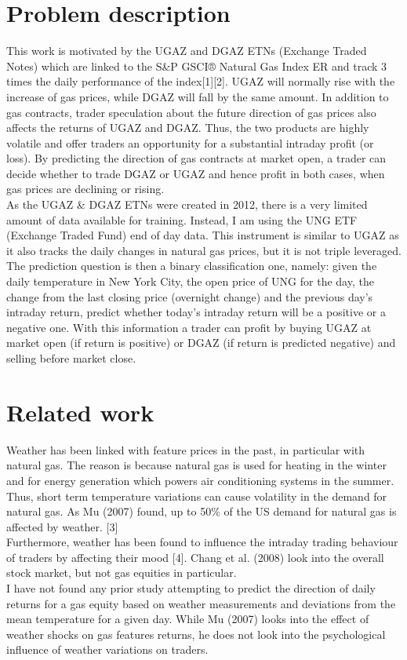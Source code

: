 \documentclass[conference,letterpaper]{IEEEtran}
\begin{document}
\section{Problem description}
This work is motivated by the UGAZ and DGAZ ETNs (Exchange Traded Notes) which are linked to
the S\&P GSCI® Natural Gas Index ER and track 3 times the daily performance of the index[1][2].
UGAZ will normally rise with the increase of gas prices, while DGAZ will fall by the same amount. In addition
to gas contracts, trader speculation about the future direction of gas prices also affects the returns of UGAZ and
DGAZ. Thus, the two products are highly volatile and offer traders an opportunity for a substantial intraday profit (or loss).
By predicting the direction of gas contracts at market open, a trader can decide
whether to trade DGAZ or UGAZ and hence profit in both cases, when gas prices are declining or rising. \\
\indent
As the UGAZ \& DGAZ ETNs were created in 2012, there is a very limited amount of data available 
for training. Instead, I am using the UNG ETF (Exchange Traded Fund) end of day data. This 
instrument is similar to UGAZ as it also tracks the daily changes in natural gas prices, 
but it is not triple leveraged. \\
\indent
The prediction question is then a binary classification one, namely: given the daily temperature 
in New York City, the open price of UNG for the day, the change from the last closing price (overnight change) and the previous day's intraday 
return, predict whether today's intraday return will be a positive or a negative one. With this information a 
trader can profit by buying UGAZ at market open (if return is positive) or DGAZ (if return is predicted negative)
and selling before market close. \\

\section{Related work}
Weather has been linked with feature prices in the past, in particular with natural gas. The reason is because
natural gas is used for heating in the winter and for energy generation which powers air conditioning systems in the summer. 
Thus, short term temperature variations can cause volatility in the demand for natural gas. As Mu (2007) found, up to
50\% of the US demand for natural gas is affected by weather. [3] \\
\indent Furthermore, weather has been found to influence the intraday trading behaviour of traders by affecting their mood [4]. 
Chang et al. (2008) look into the overall stock market, but not gas equities in particular. \\
\indent I have not found any prior study attempting to predict the direction of daily returns for a gas equity based on
weather measurements and deviations from the mean temperature for a given day. While Mu (2007) looks into the effect of
weather shocks on gas features returns, he does not look into the psychological influence of weather variations on traders. \\
\end{document}
